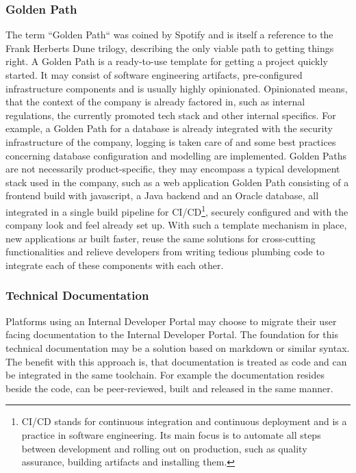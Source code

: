 \documentclass[a4paper,12pt]{article}
\begin{document}
    \subsubsection{Golden Path}
    \label{sssec:goldenpath}
    The term ``Golden Path`` was coined by Spotify\parencite{spotifygoldenpath} and is itself a reference to the Frank
    Herberts Dune trilogy, describing the only viable path to getting things right.
    A Golden Path is a ready-to-use template for getting a project quickly started.
    It may consist of software engineering artifacts, pre-configured infrastructure components and is usually highly
    opinionated.
    Opinionated means, that the context of the company is already factored in, such as internal regulations,
    the currently promoted tech stack and other internal specifics.
    For example, a Golden Path for a database is already integrated with the security infrastructure of the company,
    logging is taken care of and some best practices concerning database configuration and modelling are implemented.
    Golden Paths are not necessarily product-specific, they may encompass a typical development stack used
    in the company, such as a web application Golden Path consisting of a frontend build with javascript, a Java backend
    and an Oracle database, all integrated in a single build pipeline for CI/CD\footnote{CI/CD stands for continuous
    integration and continuous deployment and is a practice in software engineering. Its main focus is to automate all steps
    between development and rolling out on production, such as quality assurance, building artifacts and installing them.},
    securely configured and with the company look and feel already set up.
    With such a template mechanism in place, new applications ar built faster, reuse the same solutions for cross-cutting
    functionalities and relieve developers from writing tedious plumbing code to integrate each of these components with
    each other.

    \subsubsection{Technical Documentation}
    \label{sssec:techdoc}
    Platforms using an Internal Developer Portal may choose to migrate their user facing documentation to the Internal
    Developer Portal.
    The foundation for this technical documentation may be a solution based on markdown\parencite{backstagetechdocs}
    or similar syntax.
    The benefit with this approach is, that documentation is treated as code and can be integrated in the same toolchain.
    For example the documentation resides beside the code, can be peer-reviewed, built and released in the same manner.
\end{document}
